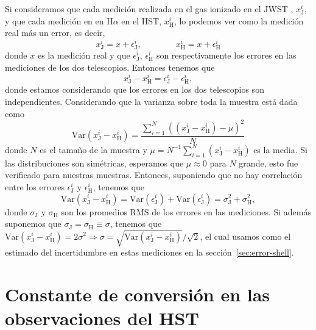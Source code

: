 \documentclass{book}
\begin{document}
Si consideramos que cada medición realizada en el gas ionizado en el JWST , $x_\mathrm{J}^i$, y que cada medición en en H$\alpha$ en el HST, $x_\mathrm{H}^i$, lo podemos ver como la medición real más un error, es decir,
\begin{equation}
    x_\mathrm{J}^i=x+\epsilon_\mathrm{J}^i,  \qquad
    \qquad
    x_\mathrm{H}^i=x+\epsilon_\mathrm{H}^i
\end{equation}
donde $x$ es la medición real y que $\epsilon_\mathrm{J}^i$, $\epsilon_\mathrm{H}^i$ son respectivamente los errores en las mediciones de los dos telescopios. Entonces tenemos que
\begin{equation}
    x_\mathrm{J}^i-x_\mathrm{H}^i=\epsilon_\mathrm{J}^i-\epsilon_\mathrm{H}^i,
\end{equation}
donde estamos considerando que los errores en los dos telescopios son independientes. Considerando que la varianza sobre toda la muestra está dada como
\begin{equation}
    \mathrm{Var}(x_\mathrm{J}^i-x_\mathrm{H}^i)=\frac{\sum_{i=1}^N ((x_\mathrm{J}^i-x_\mathrm{H}^i)-\mu)^2}{N}
\end{equation}
donde $N$ es el tamaño de la muestra y $\mu = N^{-1} \sum_{i=1}^N (x_\mathrm{J}^i-x_\mathrm{H}^i)$ es la media. 
Si las distribuciones son simétricas, esperamos que $\mu \approx 0$ para $N$ grande, esto fue verificado para nuestras muestras.
Entonces, suponiendo que no hay correlación entre los errores $\epsilon_\mathrm{J}^i$ y $\epsilon_\mathrm{H}^i$, tenemos que
\begin{equation}
    \mathrm{Var}(x_\mathrm{J}^i-x_\mathrm{H}^i)=\mathrm{Var}(\epsilon_\mathrm{J}^i)+\mathrm{Var}(\epsilon_\mathrm{J}^i)=\sigma_\mathrm{J}^2+\sigma_\mathrm{H}^2,
\end{equation}
donde $\sigma_\mathrm{J}$ y $\sigma_\mathrm{H}$
son los promedios RMS de los errores en las mediciones. 
Si además suponemos que $\sigma_\mathrm{J} = \sigma_\mathrm{H} \equiv   \sigma$, tenemos que $\mathrm{Var}(x_\mathrm{J}^i-x_\mathrm{H}^i)=2\sigma^2\Rightarrow\sigma=\sqrt{\mathrm{Var}(x_\mathrm{J}^i-x_\mathrm{H}^i)}/\sqrt{2}$, el cual usamos como el estimado del incertidumbre en estas mediciones en la sección~\ref{sec:error-shell}.


\chapter{Constante de conversión en las observaciones del HST} \label{AP : conversion EM}
\end{document}
